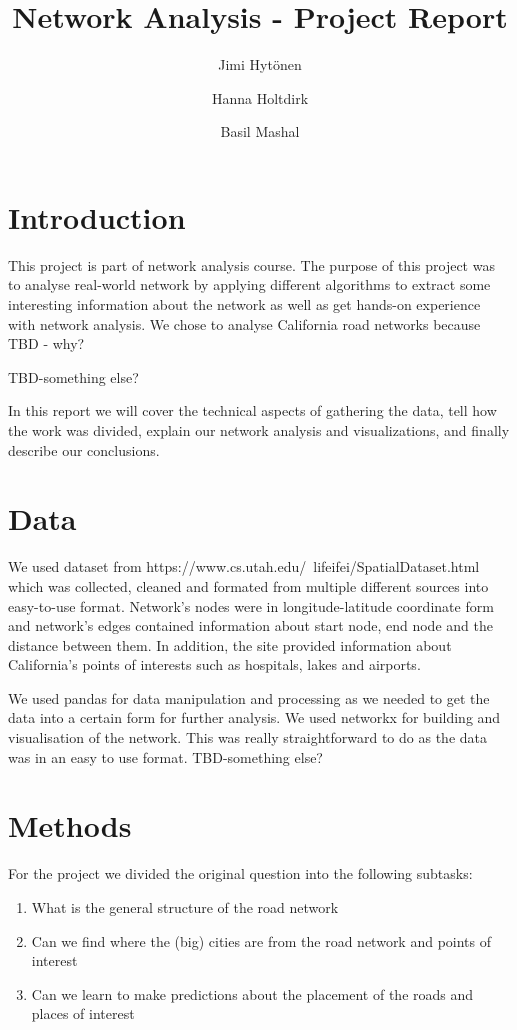 \documentclass[11pt]{article}
\title{Network Analysis - Project Report}
\author{
    Jimi Hytönen\\
    \and Hanna Holtdirk\\
    \and Basil Mashal
}
\begin{document}
\maketitle

\section{Introduction}
This project is part of network analysis course. The purpose of this project was to analyse real-world network by applying different algorithms to extract some interesting information about the network as well as get hands-on experience with network analysis. We chose to analyse California road networks because TBD - why? 

TBD-something else?

In this report we will cover the technical aspects of gathering the data, tell how the work was divided, explain our network analysis and visualizations, and finally describe our conclusions. 



\section{Data}

We used dataset from https://www.cs.utah.edu/~lifeifei/SpatialDataset.html which was collected, cleaned and formated from multiple different sources into easy-to-use format. Network's nodes were in longitude-latitude coordinate form and network's edges contained information about start node, end node and the distance between them. In addition, the site provided information about California's points of interests such as hospitals, lakes and airports.

We used pandas for data manipulation and processing as we needed to get the data into a certain form for further analysis. We used networkx for building and visualisation of the network. This was really straightforward to do as the data was in an easy to use format.  TBD-something else?

\newpage

\section{Methods}
For the project we divided the original question into the following subtasks: 
\begin{enumerate}
\item What is the general structure of the road network
\item Can we find where the (big) cities are from the road network and points of interest
\item Can we learn to make predictions about the placement of the roads and places of interest
\end{enumerate}
\end{document}
